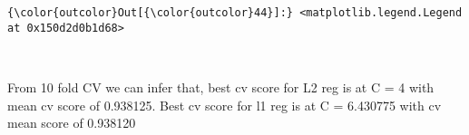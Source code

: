 \documentclass[11pt]{article}
\begin{document}
\begin{Verbatim}[commandchars=\\\{\}]
{\color{outcolor}Out[{\color{outcolor}44}]:} <matplotlib.legend.Legend at 0x150d2d0b1d68>
\end{Verbatim}
            
    \begin{center}
    \end{center}
    { \hspace*{\fill} \\}
    
    From 10 fold CV we can infer that, best cv score for L2 reg is at C = 4
with mean cv score of 0.938125. Best cv score for l1 reg is at C =
6.430775 with cv mean score of 0.938120
\end{document}
